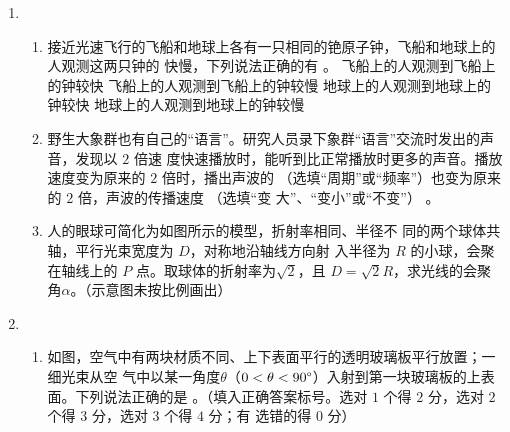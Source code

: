 \begin{enumerate}
\begin{enumerate}
	
\end{enumerate}


\item 
{}
\begin{enumerate}
	\item
接近光速飞行的飞船和地球上各有一只相同的铯原子钟，飞船和地球上的人观测这两只钟的
快慢，下列说法正确的有 \underlinegap 。
\fourchoices
{飞船上的人观测到飞船上的钟较快}
{飞船上的人观测到飞船上的钟较慢}
{地球上的人观测到地球上的钟较快}
{地球上的人观测到地球上的钟较慢}


\item 
野生大象群也有自己的“语言”。研究人员录下象群“语言”交流时发出的声音，发现以 $ 2 $ 倍速
度快速播放时，能听到比正常播放时更多的声音。播放速度变为原来的 $ 2 $ 倍时，播出声波的 \underlinegap 
（选填“周期”或“频率”）也变为原来的 $ 2 $ 倍，声波的传播速度 \underlinegap （选填“变
大”、“变小”或“不变”）
。



\item 
人的眼球可简化为如图所示的模型，折射率相同、半径不
同的两个球体共轴，平行光束宽度为 $ D $，对称地沿轴线方向射
入半径为 $ R $ 的小球，会聚在轴线上的 $ P $ 点。取球体的折射率为$ \sqrt{2} $，且 $ D=\sqrt{2}R $，求光线的会聚角$  \alpha  $。（示意图未按比例画出）
\begin{figure}[h!]
	\flushright
	
\end{figure}





\end{enumerate}


\item 
{}
\begin{enumerate}
	\item
如图，空气中有两块材质不同、上下表面平行的透明玻璃板平行放置；一细光束从空
气中以某一角度$ \theta $（$ 0< \theta <90 \degree $）入射到第一块玻璃板的上表面。下列说法正确的是 \underlinegap 。（填入正确答案标号。选对 $ 1 $ 个得 $ 2 $ 分，选对 $ 2 $ 个得 $ 3 $ 分，选对 $ 3 $ 个得 $ 4 $ 分；有
选错的得 $ 0 $ 分）
\begin{figure}[h!]
	\centering
	
\end{figure}


\end{enumerate}
\end{enumerate}
